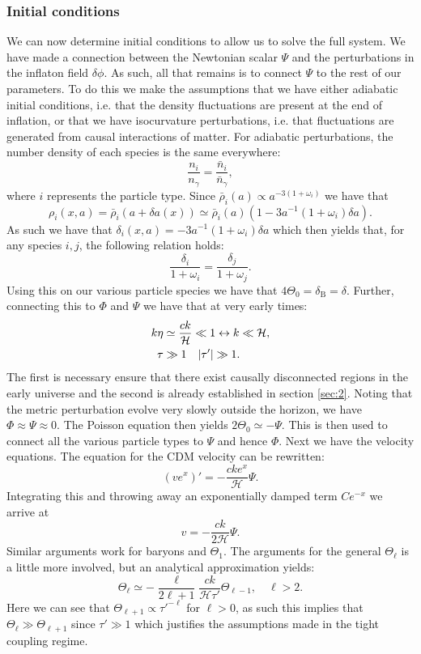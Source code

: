 \documentclass[%
reprint,
 amsmath,amssymb,
 aps,
]{revtex4-2}
\newcommand{\Hp}{\mathcal{H}}
\begin{document}
\subsubsection{Initial conditions}
We can now determine initial conditions to allow us to solve the full system. We have made a connection between the Newtonian scalar $\Psi$ and the perturbations in the inflaton field $\delta\phi$. As such, all that remains is to connect $\Psi$ to the rest of our parameters. To do this we make the assumptions that we have either adiabatic initial conditions, i.e. that the density fluctuations are present at the end of inflation, or that we have isocurvature perturbations, i.e. that fluctuations are generated from causal interactions of matter. For adiabatic perturbations, the number density of each species is the same everywhere:
\[\frac{n_i}{n_\gamma}=\frac{\bar n_i}{\bar n_\gamma},\]
where $i$ represents the particle type. Since $\bar\rho_i(a)\propto a^{-3(1+\omega_i)}$ \cite{Carroll:2004st} we have that
\[\rho_i(x,a)=\bar\rho_i(a+\delta a(x))\simeq\bar\rho_i(a)(1-3a^{-1}(1+\omega_i)\delta a).\]
As such we have that $\delta_i(x,a)=-3a^{-1}(1+\omega_i)\delta a$ which then yields that, for any species $i,j$, the following relation holds:
\[\frac{\delta_i}{1+\omega_i}=\frac{\delta_j}{1+\omega_j}.\]
Using this on our various particle species we have that $4\Theta_0=\delta_\text{B}=\delta$. Further, connecting this to $\Phi$ and $\Psi$ we have that at very early times:
\begin{align*}
	k\eta&\simeq \frac{ck}{\Hp}\ll1\leftrightarrow k\ll\Hp,\\
	\tau&\gg1\quad\abs{\tau'}\gg1.
\end{align*}
The first is necessary ensure that there exist causally disconnected regions in the early universe and the second is already established in section \ref{sec:2}. Noting that the metric perturbation evolve very slowly outside the horizon, we have $\Phi\approx\Psi\approx0$. The Poisson equation then yields $2\Theta_0\simeq-\Psi$. This is then used to connect all the various particle types to $\Psi$ and hence $\Phi$. Next we have the velocity equations. The equation for the CDM velocity can be rewritten:
\[(ve^x)'=-\frac{cke^x}{\Hp}\Psi.\]
Integrating this and throwing away an exponentially damped term $Ce^{-x}$ we arrive at
\[v=-\frac{ck}{2\Hp}\Psi.\]
Similar arguments work for baryons and $\Theta_1$. The arguments for the general $\Theta_\ell$ is a little more involved, but an analytical approximation yields: \cite{AST5220LectureNotes}
\[\Theta_\ell\simeq-\frac{\ell}{2\ell+1}\frac{ck}{\Hp\tau'}\Theta_{\ell-1},\quad \ell>2.\]
Here we can see that $\Theta_{\ell+1}\propto\tau'^{-\ell}$ for $\ell>0$, as such this implies that $\Theta_\ell\gg\Theta_{\ell+1}$ since $\tau'\gg1$ which justifies the assumptions made in the tight coupling regime. 
\end{document}
